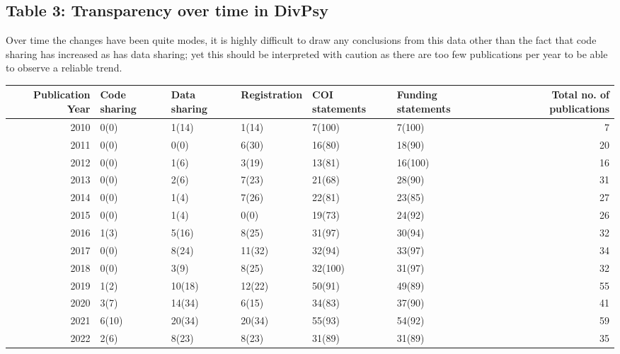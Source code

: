 \documentclass[
]{article}
\begin{document}
\hypertarget{table-3-transparency-over-time-in-divpsy}{%
\subsection{Table 3: Transparency over time in
DivPsy}\label{table-3-transparency-over-time-in-divpsy}}

Over time the changes have been quite modes, it is highly difficult to
draw any conclusions from this data other than the fact that code
sharing has increased as has data sharing; yet this should be
interpreted with caution as there are too few publications per year to
be able to observe a reliable trend.

\begin{table}
\centering\begingroup\fontsize{8}{10}\selectfont

\begin{tabular}{r|l|l|l|l|l|r}
\hline
Publication Year & Code sharing & Data sharing & Registration & COI statements & Funding statements & Total no. of publications\\
\hline
2010 & 0(0) & 1(14) & 1(14) & 7(100) & 7(100) & 7\\
\hline
2011 & 0(0) & 0(0) & 6(30) & 16(80) & 18(90) & 20\\
\hline
2012 & 0(0) & 1(6) & 3(19) & 13(81) & 16(100) & 16\\
\hline
2013 & 0(0) & 2(6) & 7(23) & 21(68) & 28(90) & 31\\
\hline
2014 & 0(0) & 1(4) & 7(26) & 22(81) & 23(85) & 27\\
\hline
2015 & 0(0) & 1(4) & 0(0) & 19(73) & 24(92) & 26\\
\hline
2016 & 1(3) & 5(16) & 8(25) & 31(97) & 30(94) & 32\\
\hline
2017 & 0(0) & 8(24) & 11(32) & 32(94) & 33(97) & 34\\
\hline
2018 & 0(0) & 3(9) & 8(25) & 32(100) & 31(97) & 32\\
\hline
2019 & 1(2) & 10(18) & 12(22) & 50(91) & 49(89) & 55\\
\hline
2020 & 3(7) & 14(34) & 6(15) & 34(83) & 37(90) & 41\\
\hline
2021 & 6(10) & 20(34) & 20(34) & 55(93) & 54(92) & 59\\
\hline
2022 & 2(6) & 8(23) & 8(23) & 31(89) & 31(89) & 35\\
\hline
\end{tabular}
\endgroup{}
\end{table}
\end{document}
